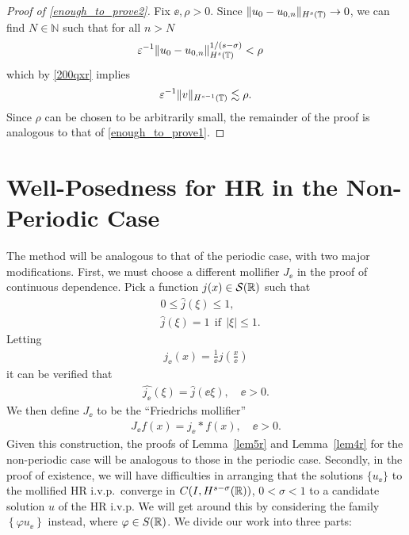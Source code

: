 \begin{proof}[Proof of \eqref{enough_to_prove2}]
Fix $\ee, \rho > 0$. Since $\|u_0 -
u_{0,n} \|_{H^s(\mathbb{T})} \to 0$, we
can find $N \in \mathbb{N}$ such that for all $n > N$
%
%
\begin{equation*}
\begin{split}
\varepsilon^{-1} \|u_0-u_{0,n}\|_{H^s(\mathbb{T})}^{1/(s-\sigma)}
& < \rho
\label{uniform_n}
\end{split}
\end{equation*}
%
%
which by \eqref{200qxr} implies
%
%
\begin{equation}
	\label{end-decay}
	\begin{split}
		\varepsilon^{-1} \|v\|_{H^{s-1}(\mathbb{T})} \lesssim \rho.
	\end{split}
\end{equation}
%
%
%
%
Since $\rho$ can be chosen to be arbitrarily small, the remainder of the 
proof is analogous to that of \eqref{enough_to_prove1}. 
\end{proof}
%
%
%
%
%
%
%
\section{Well-Posedness for HR in the Non-Periodic Case}
\label{sec:defs}
The method will be analogous to that of the periodic case, with two major
modifications. First, we must choose a different mollifier $J_\ee$ in the
proof of continuous dependence. Pick a
function $j(x) \in \mathcal{S}(\mathbb{R})$ such that
\begin{equation*}
\begin{split}
& 0 \le \widehat{j}(\xi) \le 1,
\\
& \widehat{j}(\xi) = 1 \ \ \text{if} \ \ |\xi| \le 1.
\end{split}
\end{equation*}
Letting
\begin{equation*}
\begin{split}
j_\ee(x) = \frac{1}{\ee} j \left (\frac{x}{\ee} \right )
\end{split}
\end{equation*}
it can be verified that 
\begin{equation*}
\begin{split}
\widehat{j_\ee}(\xi) = \widehat{j }(\ee \xi), \quad \ee > 0.
\end{split}
\end{equation*}
We then define $J_\ee$ to be the ``Friedrichs mollifier''
\begin{equation*}
\begin{split}
J_\ee f(x) = j_\ee * f(x), \quad \ee>0.
\end{split}
\end{equation*}
Given this construction, the proofs of Lemma~\ref{lem5r} and Lemma~\ref{lem4r} for the non-periodic case will be
analogous to those in the periodic case.
Secondly, in the proof of existence, we will have difficulties in arranging
that the solutions $\{u_\ee\}$ to the mollified HR i.v.p.\ converge in $C(I,
H^{s- \sigma}(\mathbb{R}))$, $0 < \sigma < 1$ to a candidate solution $u$ of the HR
i.v.p. We will get around this by considering the family $\left\{ \varphi
u_\ee \right\}$ instead, where $\varphi \in S(\mathbb{R})$.
%
%
%
%
We divide our work into three parts:
